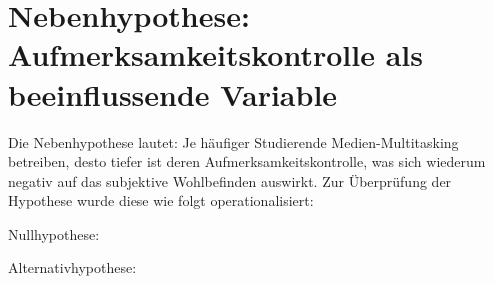 \section{Nebenhypothese: Aufmerksamkeitskontrolle als beeinflussende Variable}\label{label.nebenhypothese}
Die Nebenhypothese lautet: Je häufiger Studierende Medien-Multitasking betreiben, desto tiefer ist deren Aufmerksamkeitskontrolle, was sich wiederum negativ auf das subjektive Wohlbefinden auswirkt. Zur Überprüfung der Hypothese wurde diese wie folgt operationalisiert:\par
Nullhypothese:\\
\par
Alternativhypothese:\\

